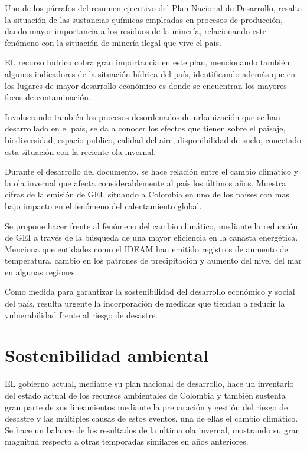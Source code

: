 \documentclass[journal]{./oldtran/IEEEtran}
\begin{document}
Uno de los párrafos del resumen ejecutivo del Plan Nacional de Desarrollo, resalta la situación de las sustancias químicas empleadas en procesos de producción, dando mayor importancia a los residuos de la minería, relacionando este fenómeno con la situación de minería ilegal que vive el país.

EL recurso hídrico cobra gran importancia en este  plan, mencionando también algunos indicadores de la situación hídrica del país, identificando además que en los lugares de mayor desarrollo económico es donde se encuentran los mayores focos de contaminación.

Involucrando también los procesos desordenados de urbanización que se han desarrollado en el país, se da a conocer los efectos que tienen sobre el paisaje, biodiversidad, espacio publico, calidad del aire, disponibilidad de suelo, conectado esta situación con la reciente ola invernal.

Durante el desarrollo del documento, se hace relación entre el cambio climático y la ola invernal que afecta considerablemente al país los últimos años. Muestra cifras de la emisión de GEI, situando a Colombia en uno de los países con mas bajo impacto en el fenómeno del calentamiento global.

Se propone hacer frente al fenómeno del cambio climático, mediante la reducción de GEI a través de la búsqueda de una mayor eficiencia en la canasta energética. Menciona que entidades como el IDEAM han emitido registros de aumento de temperatura, cambio en los patrones de precipitación y aumento del nivel del mar en algunas regiones.

Como medida para garantizar la sostenibilidad del desarrollo económico y social del país, resulta urgente la incorporación de medidas que tiendan a reducir la vulnerabilidad frente al riesgo de desastre.


\section{Sostenibilidad ambiental}

EL gobierno actual, mediante su plan nacional de desarrollo, hace un inventario del estado actual de los recursos ambientales de Colombia y también sustenta gran parte de sus lineamientos mediante la preparación y gestión del riesgo de desastre y las múltiples causas de estos eventos, una de ellas el cambio climático. Se hace un balance de los resultados de la ultima ola invernal, mostrando su gran magnitud respecto a otras temporadas similares en años anteriores. 
\end{document}
